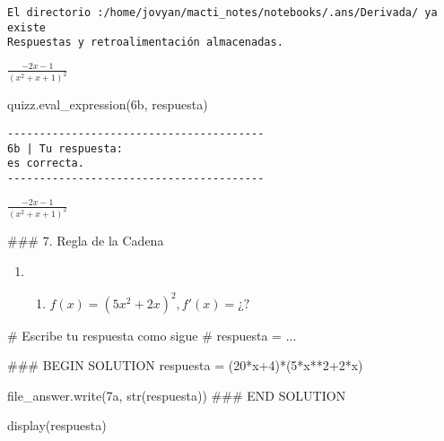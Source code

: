 \documentclass[
  letterpaper,
  DIV=11,
  numbers=noendperiod]{scrreprt}
\newenvironment{Shaded}{\begin{snugshade}}{\end{snugshade}}
\newcommand{\BuiltInTok}[1]{\textcolor[rgb]{0.00,0.23,0.31}{#1}}
\newcommand{\CommentTok}[1]{\textcolor[rgb]{0.37,0.37,0.37}{#1}}
\newcommand{\DecValTok}[1]{\textcolor[rgb]{0.68,0.00,0.00}{#1}}
\newcommand{\NormalTok}[1]{\textcolor[rgb]{0.00,0.23,0.31}{#1}}
\newcommand{\OperatorTok}[1]{\textcolor[rgb]{0.37,0.37,0.37}{#1}}
\newcommand{\RegionMarkerTok}[1]{\textcolor[rgb]{0.00,0.23,0.31}{#1}}
\newcommand{\StringTok}[1]{\textcolor[rgb]{0.13,0.47,0.30}{#1}}
\providecommand{\tightlist}{%
  \setlength{\itemsep}{0pt}\setlength{\parskip}{0pt}}\usepackage{longtable,booktabs,array}
\begin{document}
\begin{verbatim}
El directorio :/home/jovyan/macti_notes/notebooks/.ans/Derivada/ ya existe
Respuestas y retroalimentación almacenadas.
\end{verbatim}

$\displaystyle \frac{- 2 x - 1}{\left(x^{2} + x + 1\right)^{2}}$

\begin{Shaded}
\begin{Highlighting}[]
\NormalTok{quizz.eval\_expression(}\StringTok{\textquotesingle{}6b\textquotesingle{}}\NormalTok{, respuesta)}
\end{Highlighting}
\end{Shaded}

\begin{verbatim}
----------------------------------------
6b | Tu respuesta:
es correcta.
----------------------------------------
\end{verbatim}

$\displaystyle \frac{- 2 x - 1}{\left(x^{2} + x + 1\right)^{2}}$

\#\#\# 7. Regla de la Cadena

\begin{enumerate}
\def\labelenumi{\arabic{enumi}.}
\setcounter{enumi}{6}
\tightlist
\item
  \begin{enumerate}
  \def\labelenumii{\alph{enumii}.}
  \tightlist
  \item
    \(f(x) = (5x^2 + 2x)^{2}, f'(x) = ¿?\)
  \end{enumerate}
\end{enumerate}

\begin{Shaded}
\begin{Highlighting}[]
\CommentTok{\# Escribe tu respuesta como sigue }
\CommentTok{\# respuesta = ...}

\CommentTok{\#\#\# }\RegionMarkerTok{BEGIN}\CommentTok{ SOLUTION}
\NormalTok{respuesta }\OperatorTok{=}\NormalTok{ (}\DecValTok{20}\OperatorTok{*}\NormalTok{x}\OperatorTok{+}\DecValTok{4}\NormalTok{)}\OperatorTok{*}\NormalTok{(}\DecValTok{5}\OperatorTok{*}\NormalTok{x}\OperatorTok{**}\DecValTok{2}\OperatorTok{+}\DecValTok{2}\OperatorTok{*}\NormalTok{x)}

\NormalTok{file\_answer.write(}\StringTok{\textquotesingle{}7a\textquotesingle{}}\NormalTok{, }\BuiltInTok{str}\NormalTok{(respuesta))}
\CommentTok{\#\#\# }\RegionMarkerTok{END}\CommentTok{ SOLUTION}

\NormalTok{display(respuesta)}
\end{Highlighting}
\end{Shaded}
\end{document}
